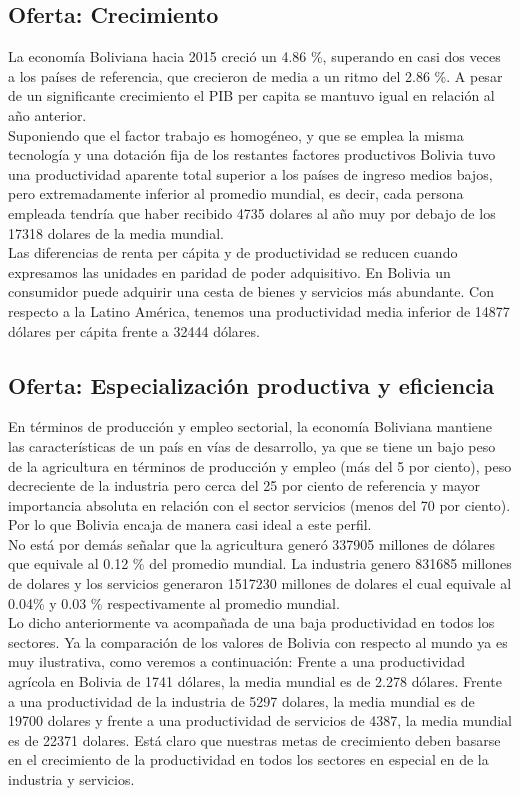     \subsection{Oferta: Crecimiento}
    La economía Boliviana hacia 2015 creció un 4.86 \%, superando en casi dos veces a los países de referencia, que crecieron de media a un ritmo del 2.86 \%. A pesar de un significante crecimiento el PIB per capita se mantuvo igual en relación al año anterior.\\
    Suponiendo que el factor trabajo es homogéneo, y que se emplea la misma tecnología y una dotación fija de los restantes factores productivos Bolivia tuvo una productividad aparente total superior a los países de ingreso medios bajos, pero extremadamente inferior al promedio mundial, es decir, cada persona empleada tendría que haber recibido 4735 dolares al año muy por debajo de los 17318 dolares de la media mundial.\\
    Las diferencias de renta per cápita y de productividad se reducen cuando expresamos las unidades en paridad de poder adquisitivo. En Bolivia un consumidor puede adquirir una cesta de bienes y servicios más abundante. Con respecto a la Latino América, tenemos una productividad media inferior de 14877 dólares per cápita frente a 32444 dólares.


    \subsection{Oferta: Especialización productiva y eficiencia}
    En términos de producción y empleo sectorial, la economía Boliviana mantiene las características de un país en vías de desarrollo, ya que se tiene un bajo peso de la agricultura en términos de producción y empleo (más del 5 por ciento), peso decreciente de la industria pero cerca del 25 por ciento de referencia y mayor importancia absoluta en relación con el sector servicios (menos del 70 por ciento). Por lo que Bolivia encaja de manera casi ideal a este perfil.\\
    No está por demás señalar que la agricultura generó 337905 millones de dólares que equivale al 0.12 \% del promedio mundial. La industria genero 831685 millones de dolares y los servicios generaron 1517230 millones de dolares el cual equivale al 0.04\% y 0.03 \% respectivamente al promedio mundial.\\
    Lo dicho anteriormente va acompañada de una baja productividad en todos los sectores. Ya la comparación de los valores de Bolivia con respecto al mundo ya es muy ilustrativa, como veremos a continuación: Frente a una productividad agrícola en Bolivia de 1741 dólares, la media mundial es de 2.278 dólares. Frente a una productividad  de la industria de 5297 dolares, la media mundial es de 19700 dolares y frente a una productividad de servicios de 4387, la media mundial es de 22371 dolares. Está claro que nuestras metas de crecimiento deben basarse en el crecimiento de la productividad en todos los sectores en especial en de la industria y servicios.\\


